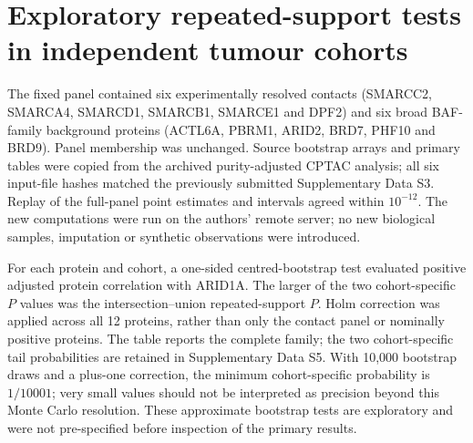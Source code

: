 \documentclass[11pt,letterpaper]{article}
\begin{document}
\clearpage
\section*{Exploratory repeated-support tests in independent tumour cohorts}
The fixed panel contained six experimentally resolved contacts (SMARCC2, SMARCA4, SMARCD1, SMARCB1, SMARCE1 and DPF2) and six broad BAF-family background proteins (ACTL6A, PBRM1, ARID2, BRD7, PHF10 and BRD9). Panel membership was unchanged. Source bootstrap arrays and primary tables were copied from the archived purity-adjusted CPTAC analysis; all six input-file hashes matched the previously submitted Supplementary Data S3. Replay of the full-panel point estimates and intervals agreed within $10^{-12}$. The new computations were run on the authors' remote server; no new biological samples, imputation or synthetic observations were introduced.

For each protein and cohort, a one-sided centred-bootstrap test evaluated positive adjusted protein correlation with ARID1A. The larger of the two cohort-specific $P$ values was the intersection--union repeated-support $P$. Holm correction was applied across all 12 proteins, rather than only the contact panel or nominally positive proteins. The table reports the complete family; the two cohort-specific tail probabilities are retained in Supplementary Data S5. With 10,000 bootstrap draws and a plus-one correction, the minimum cohort-specific probability is $1/10001$; very small values should not be interpreted as precision beyond this Monte Carlo resolution. These approximate bootstrap tests are exploratory and were not pre-specified before inspection of the primary results.
\end{document}
